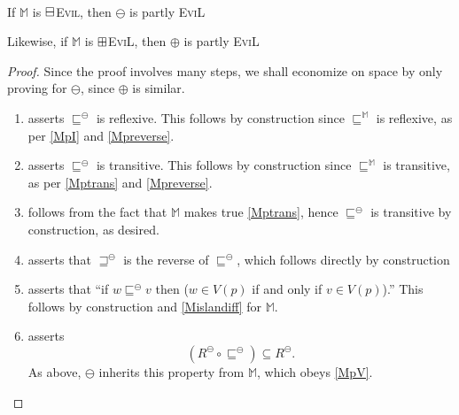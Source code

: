 \begin{lemma}[$\BM/\BP$ Completion]\label{bm-bp completion}\ \\
If $\mathbb{M}$ is $\boxminus$\textsc{Evil}, then $\ominus$ is
partly \textsc{EviL}

Likewise, if $\mathbb{M}$ is $\boxplus$\textsc{EviL}, then $\oplus$ is
partly \textsc{EviL}
\end{lemma}
\begin{proof}
Since the proof involves many steps, we shall economize on space by
only proving for $\ominus$, since $\oplus$ is similar.
\begin{enumerate}[label=\textup{(\emph{\Roman*})$'$}, topsep=0.0in,
  parsep=0.075in]
\item asserts $\sqsubseteq^\ominus$ is reflexive.  This follows by
  construction since $\sqsubseteq^\mathbb{M}$ is reflexive, as per
  \ref{MpI} and \ref{Mpreverse}.
\item asserts $\sqsubseteq^\ominus$ is transitive.  This follows by
  construction since $\sqsubseteq^\mathbb{M}$ is transitive, as per
  \ref{Mptrans} and \ref{Mpreverse}.
 \item follows from the fact that $\mathbb{M}$ makes true \ref{Mptrans}, hence
   $\sqsubseteq^\ominus$ is transitive by construction, as desired.
  
\item asserts that $\sqsupseteq^\ominus$ is the reverse of
  $\sqsubseteq^\ominus$, which follows directly by construction
\item asserts that ``if $w \sqsubseteq^\ominus v$ then ($w \in V (p)$
  if and only if $v \in V (p)$).''  This follows by construction and
  \ref{Mislandiff} for $\mathbb{M}$.
\item asserts  \[(R^{\ominus} \circ \sqsubseteq^{\ominus}) \subseteq
    R^{\ominus}.\]
As above, $\ominus$ inherits this property from $\mathbb{M}$, which
obeys \ref{MpV}.


\end{enumerate}
\end{proof}
